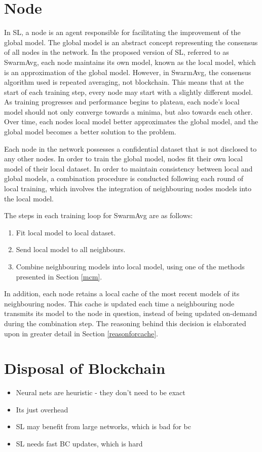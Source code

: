 \section{Node}
In SL, a node is an agent responsible for facilitating the improvement of the global model. The global model is an abstract concept representing the consensus of all nodes in the network. In the proposed version of SL, referred to as SwarmAvg, each node maintains its own model, known as the local model, which is an approximation of the global model. However, in SwarmAvg, the consensus algorithm used is repeated averaging, not blockchain. This means that at the start of each training step, every node may start with a slightly different model. As training progresses and performance begins to plateau, each node's local model should not only converge towards a minima, but also towards each other. Over time, each nodes local model better approximates the global model, and the global model becomes a better solution to the problem.

Each node in the network possesses a confidential dataset that is not disclosed to any other nodes. In order to train the global model, nodes fit their own local model of their local dataset. In order to maintain consistency between local and global models, a combination procedure is conducted following each round of local training, which involves the integration of neighbouring nodes models into the local model.

The steps in each training loop for SwarmAvg are as follows:
\begin{enumerate}
	\item Fit local model to local dataset.
	\item Send local model to all neighbours.
	\item Combine neighbouring models into local model, using one of the methods presented in Section \ref{mcm}.
\end{enumerate}

In addition, each node retains a local cache of the most recent models of its neighbouring nodes. This cache is updated each time a neighbouring node transmits its model to the node in question, instead of being updated on-demand during the combination step. The reasoning behind this decision is elaborated upon in greater detail in Section \ref{reasonforcache}.

\section{Disposal of Blockchain}
\begin{itemize}
	\item Neural nets are heuristic - they don't need to be exact
	\item Its just overhead
	\item SL may benefit from large networks, which is bad for bc
	\item SL needs fast BC updates, which is hard
\end{itemize}


